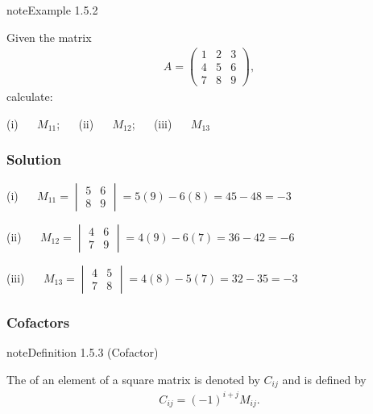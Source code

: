 \documentclass[letterpaper,10pt,english]{jupyterBook}
\begin{document}
\begin{sphinxadmonition}{note}{Example 1.5.2}



\sphinxAtStartPar
Given the matrix
\begin{equation*}
\begin{split} A = \begin{pmatrix} 1 & 2 & 3 \\ 4 & 5 & 6 \\ 7 & 8 & 9 \end{pmatrix},\end{split}
\end{equation*}
\sphinxAtStartPar
calculate:

\sphinxAtStartPar
(i)   \(M_{11}\);  
(ii)   \(M_{12}\);  
(iii)   \(M_{13}\)
\subsubsection*{Solution}

\sphinxAtStartPar
(i)   \( M_{11} = \begin{vmatrix} 5 & 6 \\ 8 & 9 \end{vmatrix} = 5(9) - 6(8) = 45 - 48 = -3 \)

\sphinxAtStartPar
(ii)   \( M_{12} = \begin{vmatrix} 4 & 6 \\ 7 & 9 \end{vmatrix} = 4(9) - 6(7) = 36 - 42 = -6 \)

\sphinxAtStartPar
(iii)   \( M_{13} = \begin{vmatrix} 4 & 5 \\ 7 & 8 \end{vmatrix} = 4(8) - 5(7) = 32 - 35 = -3 \)
\end{sphinxadmonition}


\subsubsection{Cofactors}
\label{\detokenize{_pages/1.4_Determinants:cofactors}}
\ignorespaces \label{_pages/1.4_Determinants:cofactor-definition}
\begin{sphinxadmonition}{note}{Definition 1.5.3 (Cofactor)}



\sphinxAtStartPar
The  of an element of a square matrix is denoted by \(C_{ij}\) and is defined by
\begin{equation}\label{equation:_pages/1.4_Determinants:cofactor-equation}
\begin{split} C_{ij} = (-1)^{i+j}M_{ij}. \end{split}
\end{equation}\end{sphinxadmonition}
\end{document}
